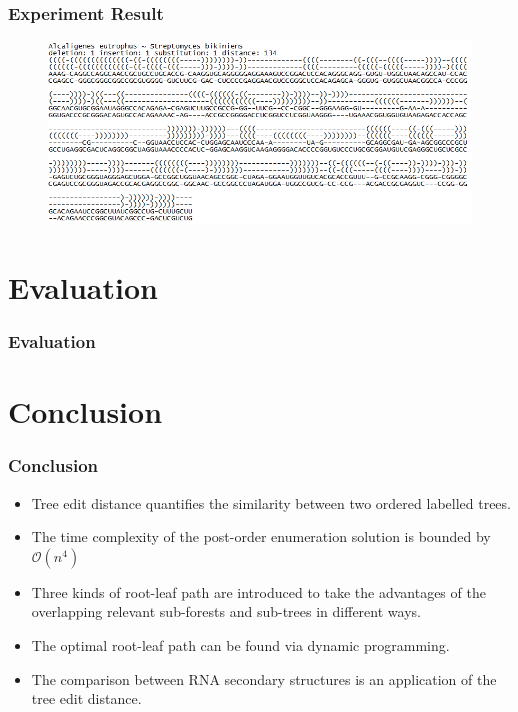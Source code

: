 \documentclass{beamer}
\begin{document}
\begin{frame}
\frametitle{Experiment Result}
\begin{figure}
	\includegraphics[width=1.0\linewidth]{AlignmentResult}
	\centering
\end{figure}
\end{frame}
\section{Evaluation}
\begin{frame}
\frametitle{Evaluation}

\end{frame}
\section{Conclusion}
\begin{frame}
\frametitle{Conclusion}
\begin{itemize}
\item Tree edit distance quantifies the similarity between two ordered labelled trees. 
\item The time complexity of the post-order enumeration solution is bounded by $\mathcal{O}(n^4)$
\item Three kinds of root-leaf path are introduced to take the advantages of the overlapping relevant sub-forests and sub-trees in different ways.
\item The optimal root-leaf path can be found via dynamic programming.
\item The comparison between RNA secondary structures is an application of the tree edit distance.
\end{itemize}
\end{frame}
\end{document}
